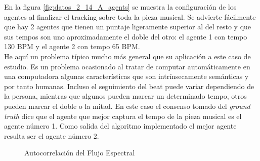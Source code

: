 \documentclass[12pt,a4paper,titlepage]{report}
\begin{document}
En la figura \ref{fig:datos_2_14_A_agents} se muestra la configuración de los agentes al finalizar el tracking sobre toda la pieza musical. Se advierte fácilmente que hay 2 agentes que tienen un puntaje ligeramente superior al del resto y que sus tempos son uno aproximadamente el doble del otro: el agente 1 con tempo 130 BPM y el agente 2 con tempo 65 BPM.\\

He aquí un problema típico mucho más general que su aplicación a este caso de estudio. Es un problema ocasionado al tratar de computar automáticamente en una computadora algunas características que son intrínsecamente semánticas y por tanto humanas. Incluso el seguimiento del beat puede variar dependiendo de la persona, mientras que algunos pueden marcar un determinado tempo, otros pueden marcar el doble o la mitad. En este caso el consenso tomado del \emph{ground truth} dice que el agente que mejor captura el tempo de la pieza musical es el agente número 1. Como salida del algoritmo implementado el mejor agente resulta ser el agente número 2.\\

\begin{figure} [h!]
\centering
  \caption{Autocorrelación del Flujo Espectral}
  \label{fig:datos_2_14_A_autocorrelaciones}
\end{figure}
\end{document}
